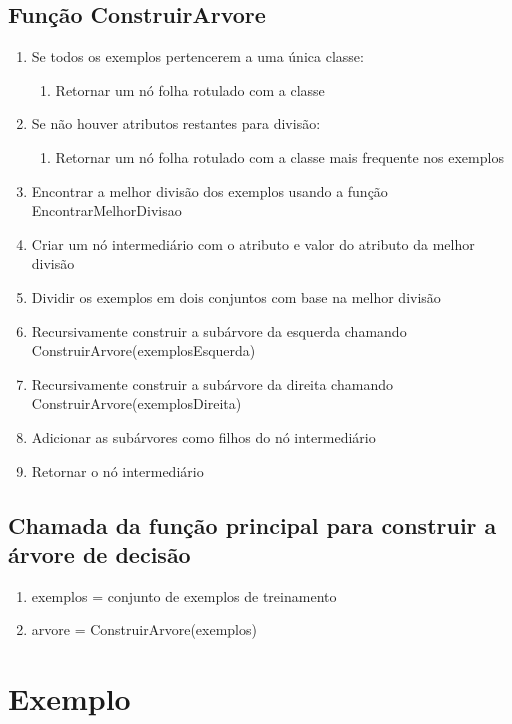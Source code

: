 \documentclass[12pt,a4paper, brazil]{article}
\begin{document}
\subsection{Função ConstruirArvore}
\begin{enumerate}
  \item Se todos os exemplos pertencerem a uma única classe:
  \begin{enumerate}
    \item Retornar um nó folha rotulado com a classe
  \end{enumerate}
  \item Se não houver atributos restantes para divisão:
  \begin{enumerate}
    \item Retornar um nó folha rotulado com a classe mais frequente nos exemplos
  \end{enumerate}
  \item Encontrar a melhor divisão dos exemplos usando a função EncontrarMelhorDivisao
  \item Criar um nó intermediário com o atributo e valor do atributo da melhor divisão
  \item Dividir os exemplos em dois conjuntos com base na melhor divisão
  \item Recursivamente construir a subárvore da esquerda chamando ConstruirArvore(exemplosEsquerda)
  \item Recursivamente construir a subárvore da direita chamando ConstruirArvore(exemplosDireita)
  \item Adicionar as subárvores como filhos do nó intermediário
  \item Retornar o nó intermediário
\end{enumerate}

\subsection{Chamada da função principal para construir a árvore de decisão}
\begin{enumerate}
  \item exemplos = conjunto de exemplos de treinamento
  \item arvore = ConstruirArvore(exemplos)
\end{enumerate}

\section{Exemplo}
\end{document}
